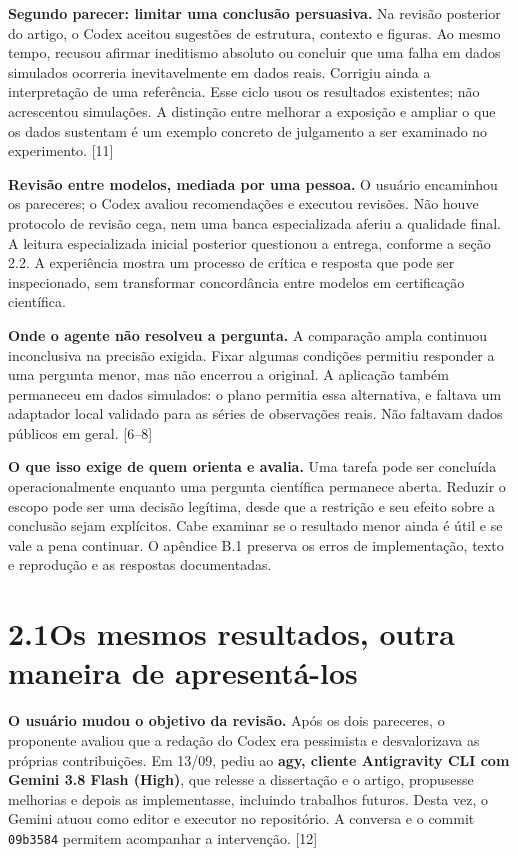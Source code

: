 \documentclass[11pt,a4paper]{article}
\newcommand{\fonte}[1]{{\small\color{navy}[#1]}}
\newcommand{\titulo}[2]{\section*{\color{navy}#1\quad #2}}
\begin{document}
\textbf{Segundo parecer: limitar uma conclusão persuasiva.} Na revisão posterior do artigo, o Codex aceitou sugestões de estrutura, contexto e figuras. Ao mesmo tempo, recusou afirmar ineditismo absoluto ou concluir que uma falha em dados simulados ocorreria inevitavelmente em dados reais. Corrigiu ainda a interpretação de uma referência. Esse ciclo usou os resultados existentes; não acrescentou simulações. A distinção entre melhorar a exposição e ampliar o que os dados sustentam é um exemplo concreto de julgamento a ser examinado no experimento. \fonte{11}

\begin{destaque}
\textbf{Revisão entre modelos, mediada por uma pessoa.} O usuário encaminhou os pareceres; o Codex avaliou recomendações e executou revisões. Não houve protocolo de revisão cega, nem uma banca especializada aferiu a qualidade final. A leitura especializada inicial posterior questionou a entrega, conforme a seção 2.2. A experiência mostra um processo de crítica e resposta que pode ser inspecionado, sem transformar concordância entre modelos em certificação científica.
\end{destaque}

\textbf{Onde o agente não resolveu a pergunta.} A comparação ampla continuou inconclusiva na precisão exigida. Fixar algumas condições permitiu responder a uma pergunta menor, mas não encerrou a original. A aplicação também permaneceu em dados simulados: o plano permitia essa alternativa, e faltava um adaptador local validado para as séries de observações reais. Não faltavam dados públicos em geral. \fonte{6--8}

\textbf{O que isso exige de quem orienta e avalia.} Uma tarefa pode ser concluída operacionalmente enquanto uma pergunta científica permanece aberta. Reduzir o escopo pode ser uma decisão legítima, desde que a restrição e seu efeito sobre a conclusão sejam explícitos. Cabe examinar se o resultado menor ainda é útil e se vale a pena continuar. O apêndice B.1 preserva os erros de implementação, texto e reprodução e as respostas documentadas.

\newpage

\titulo{2.1}{Os mesmos resultados, outra maneira de apresentá-los}
\textbf{O usuário mudou o objetivo da revisão.} Após os dois pareceres, o proponente avaliou que a redação do Codex era pessimista e desvalorizava as próprias contribuições. Em 13/09, pediu ao \textbf{agy, cliente Antigravity CLI com Gemini 3.8 Flash (High)}, que relesse a dissertação e o artigo, propusesse melhorias e depois as implementasse, incluindo trabalhos futuros. Desta vez, o Gemini atuou como editor e executor no repositório. A conversa e o commit \nolinkurl{09b3584} permitem acompanhar a intervenção. \fonte{12}
\end{document}
